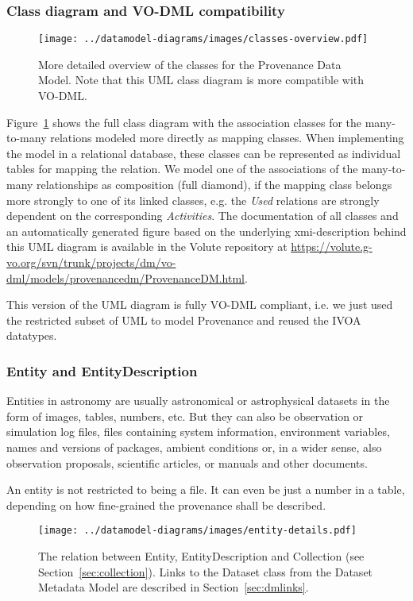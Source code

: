 \subsubsection{Class diagram and VO-DML compatibility}
\begin{figure}[h]
\centering
\texttt{[image: ../datamodel-diagrams/images/classes-overview.pdf]}
\caption{More detailed overview of the classes for the Provenance Data Model. Note that this UML class diagram is more compatible with VO-DML.}
\label{fig:classdiagram}
\end{figure}

Figure~\ref{fig:classdiagram} shows the full class diagram with the association classes for the many-to-many relations modeled more directly as mapping classes. When implementing the model in a relational database, these classes can be represented as individual tables for mapping the relation. We model one of the associations of the many-to-many relationships as composition (full diamond), if the mapping class belongs more strongly to one of its linked classes, e.g. the \emph{Used} relations are strongly dependent on the corresponding \emph{Activities}. The documentation of all classes and an automatically generated figure based on the underlying xmi-description behind this UML diagram is available in the Volute repository at \url{https://volute.g-vo.org/svn/trunk/projects/dm/vo-dml/models/provenancedm/ProvenanceDM.html}.

This version of the UML diagram is fully VO-DML compliant, i.e. we just used the restricted subset of UML to model
Provenance and reused the IVOA datatypes.


\subsubsection{Entity and EntityDescription}
Entities in astronomy are usually astronomical or astrophysical datasets in the 
form of images, tables, numbers, etc. But they can also be observation or 
simulation log files, files containing system information, environment variables, names and versions of packages, ambient conditions or, in a wider sense, also observation proposals, scientific 
articles, or manuals and other documents. 

An entity is not restricted to being
a file. 
It can even be just a number in a table, depending on how fine-grained the 
provenance shall be described.

\begin{figure}[h]
\centering
\texttt{[image: ../datamodel-diagrams/images/entity-details.pdf]}
\caption{The relation between Entity, EntityDescription and Collection (see Section~\ref{sec:collection}). 
Links to the Dataset class from the Dataset Metadata Model are described in Section~\ref{sec:dmlinks}.}
\label{fig:entity-details}
\end{figure}

